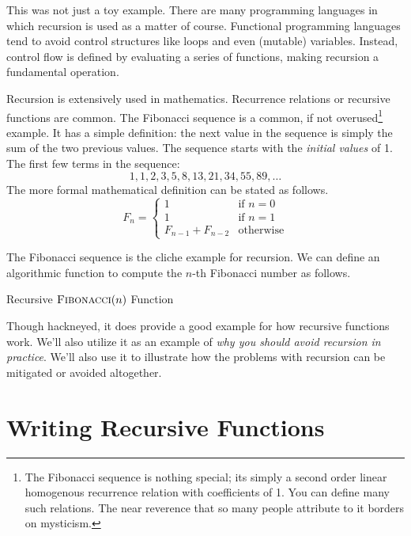 This was not just a toy example.  There are many programming languages in which
recursion is used as a matter of course.  Functional programming languages
tend to avoid control structures like loops and even (mutable) variables.  
Instead, control flow is defined by evaluating a series of functions, making
recursion a fundamental operation.  

Recursion is extensively used in mathematics.  Recurrence relations or
recursive functions are common.  The Fibonacci sequence is
a common, if not overused\footnote{The Fibonacci sequence is nothing
special; its simply a second order linear homogenous recurrence relation
with coefficients of 1.  You can define many such relations.  The 
near reverence that so many people attribute to it borders on mysticism.}
example.  It has a simple definition: the next value in the sequence is
simply the sum of the two previous values.  The sequence starts with the 
\emph{initial values} of 1.  The first few terms in the sequence:
  $$1, 1, 2, 3, 5, 8, 13, 21, 34, 55, 89, \ldots$$
The more formal mathematical definition can be stated as follows.
\[
F_n = \left\{
\begin{array}{ll}
1 & \text{if } n = 0 \\
1 & \text{if } n = 1 \\
F_{n-1} + F_{n-2} & \text{otherwise}
\end{array}
\right.
\]

The Fibonacci sequence is the cliche example for recursion.  We can 
define an algorithmic function to compute the $n$-th Fibonacci number
as follows.

\begin{algorithm}[H]
 
\caption{Recursive $\textsc{Fibonacci}(n)$ Function}
\label{algo:recursiveFibonacci}
\end{algorithm}

Though hackneyed, it does provide a good example for how recursive functions
work.  We'll also utilize it as an example of \emph{why you should avoid
recursion in practice}.  We'll also use it to illustrate how the problems
with recursion can be mitigated or avoided altogether.

\section{Writing Recursive Functions}

